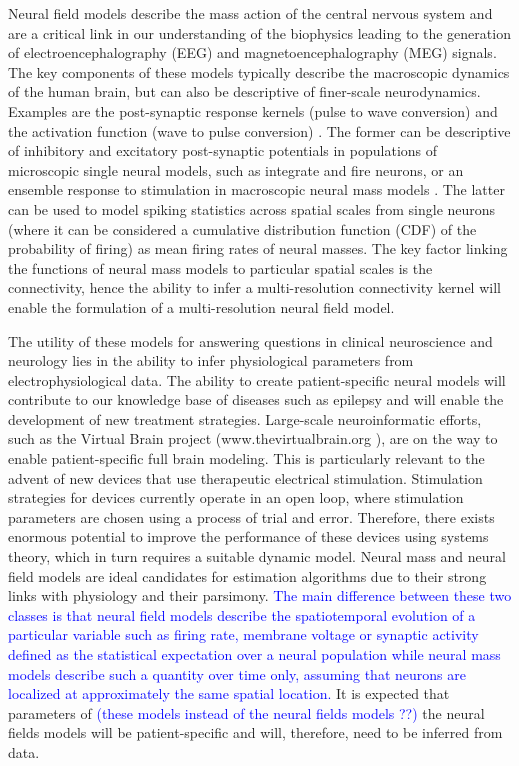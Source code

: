 \documentclass[review,authoryear,3p]{elsarticle}
\newcommand{\parham}[1]{\textcolor{blue}{#1}}
\begin{document}
Neural field models describe the mass action of the central nervous system and are a critical link in our understanding of the biophysics leading to the generation of  electroencephalography (EEG) and magnetoencephalography (MEG) signals. The key components of these models typically describe the macroscopic dynamics of the human brain, but can also be descriptive of finer-scale neurodynamics. Examples are the post-synaptic response kernels (pulse to wave conversion) and the activation function (wave to pulse conversion) \citep{Jirsa1996,Jirsa1997}. The former can be descriptive of inhibitory and excitatory post-synaptic potentials in populations of microscopic single neural models, such as integrate and fire neurons, or an ensemble response to stimulation in macroscopic neural mass models \citep{Stefanescu2008}. The latter can be used to model spiking statistics across spatial scales from single neurons (where it can be considered a cumulative distribution function (CDF) of the probability of firing) as mean firing rates of neural masses. The key factor linking the functions of neural mass models to particular spatial scales is the connectivity, hence the ability to infer a multi-resolution connectivity kernel will enable the formulation of a multi-resolution neural field model.  

The utility of these models for answering questions in clinical neuroscience and neurology lies in the ability to infer physiological parameters from electrophysiological data. The ability to create patient-specific neural models will contribute to our knowledge base of diseases such as epilepsy and will enable the development of new treatment strategies. Large-scale neuroinformatic efforts, such as the Virtual Brain project (www.thevirtualbrain.org \citep{Jirsa2010}), are on the way to enable patient-specific full brain modeling. This is particularly relevant to the advent of new devices that use therapeutic electrical stimulation. Stimulation strategies for devices currently operate in an open loop, where stimulation parameters are chosen using a process of trial and error. Therefore, there exists enormous potential to improve the performance of these devices using systems theory, which in turn requires a suitable dynamic model. Neural mass and neural field models are ideal candidates for estimation algorithms due to their strong links with physiology and their parsimony. \parham{The main difference between these two classes is that neural field models describe the spatiotemporal evolution of a particular variable such as firing rate, membrane voltage or synaptic activity defined as the statistical expectation over a neural population while neural mass models describe such a quantity over time only, assuming that neurons are localized at approximately the same spatial location.} It is expected that parameters of \parham{(these models instead of the neural fields models ??)} the neural fields models will be patient-specific and will, therefore, need to be inferred from data. 
\end{document}
